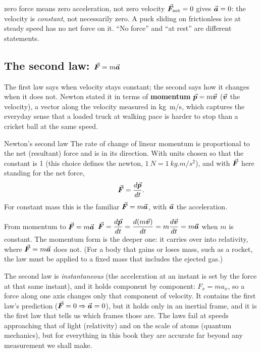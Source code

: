 \begin{trapbox}{zero force means zero acceleration, not zero velocity}
$\vec{\bm{F}}_{\text{net}}=0$ gives $\vec{\bm{a}}=0$: the velocity is \emph{constant}, not necessarily zero. A puck
sliding on frictionless ice at steady speed has no net force on it. ``No force'' and ``at rest'' are
different statements.
\end{trapbox}

\subsection{\texorpdfstring{The second law: $\vec{\bm{F}}=m\vec{\bm{a}}$}{The second law: F = ma}}

The first law says when velocity stays constant; the second says how it changes when it does not. Newton stated it in terms of \textbf{momentum} $\vec{\bm{p}}=m\vec{\bm{v}}$ ($\vec{\bm{v}}$ the velocity), a vector along
the velocity measured in \si{kg.m/s}, which captures the everyday sense that a loaded truck at walking
pace is harder to stop than a cricket ball at the same speed.

\begin{keybox}{Newton's second law}
The rate of change of linear momentum is proportional to the net (resultant) force and is in its
direction. With units chosen so that the constant is 1 (this choice defines the newton,
$\SI{1}{N}=\SI{1}{kg.m/s^2}$), and with $\vec{\bm{F}}$ here standing for the net force,
\[
\vec{\bm{F}}=\frac{d\vec{\bm{p}}}{dt}.
\]
For constant mass this is the familiar $\vec{\bm{F}}=m\vec{\bm{a}}$, with $\vec{\bm{a}}$ the acceleration.
\end{keybox}

\begin{derivbox}{From momentum to $\vec{\bm{F}}=m\vec{\bm{a}}$}
$\vec{\bm{F}}=\dfrac{d\vec{\bm{p}}}{dt}=\dfrac{d(m\vec{\bm{v}})}{dt}=m\dfrac{d\vec{\bm{v}}}{dt}=m\vec{\bm{a}}$ when $m$ is constant. The momentum form
is the deeper one: it carries over into relativity, where $\vec{\bm{F}}=m\vec{\bm{a}}$ does not. (For a body that gains
or loses mass, such as a rocket, the law must be applied to a fixed mass that includes the ejected gas.)
\end{derivbox}

The second law is \emph{instantaneous} (the acceleration at an instant is set by the force at that same
instant), and it holds component by component: $F_x=ma_x$, so a force along one axis changes only that
component of velocity. It contains the first law's prediction ($\vec{\bm{F}}=0\Rightarrow\vec{\bm{a}}=0$), but it holds
only in an inertial frame, and it is the first law that tells us which frames those are. The laws fail at
speeds approaching that of light (relativity) and on the scale of atoms (quantum mechanics), but for
everything in this book they are accurate far beyond any measurement we shall make.

